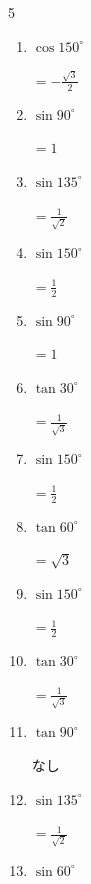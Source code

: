 \begin{multicols}{5}
\begin{enumerate}
  \item $\displaystyle \cos{150^\circ}$

        $\displaystyle =-\frac{\sqrt{3}}{2}$

  \item $\displaystyle \sin{90^\circ}$

        $\displaystyle =1$

  \item $\displaystyle \sin{135^\circ}$

        $\displaystyle =\frac{1}{\sqrt{2}}$

  \item $\displaystyle \sin{150^\circ}$

        $\displaystyle =\frac{1}{2}$

  \item $\displaystyle \sin{90^\circ}$

        $\displaystyle =1$

  \item $\displaystyle \tan{30^\circ}$

        $\displaystyle =\frac{1}{\sqrt{3}}$

  \item $\displaystyle \sin{150^\circ}$

        $\displaystyle =\frac{1}{2}$

  \item $\displaystyle \tan{60^\circ}$

        $\displaystyle =\sqrt{3}$

  \item $\displaystyle \sin{150^\circ}$

        $\displaystyle =\frac{1}{2}$

  \item $\displaystyle \tan{30^\circ}$

        $\displaystyle =\frac{1}{\sqrt{3}}$

\columnbreak %

\resetques

  \item $\displaystyle \tan{90^\circ}$

        $\displaystyle なし$

  \item $\displaystyle \sin{135^\circ}$

        $\displaystyle =\frac{1}{\sqrt{2}}$

  \item $\displaystyle \sin{60^\circ}$


\end{enumerate}
\end{multicols}
